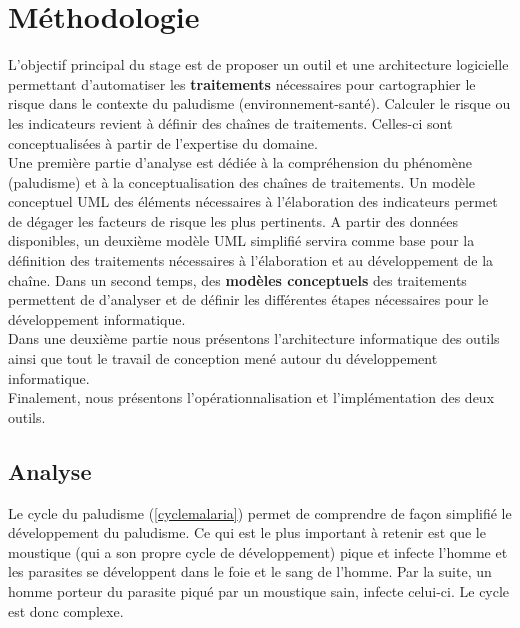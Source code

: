\chapter{Méthodologie} \label{Methodologie}

L'objectif principal du stage est de proposer un outil et une architecture logicielle permettant d'automatiser les \textbf{traitements} nécessaires pour cartographier le risque dans le contexte du paludisme (environnement-santé). Calculer le risque ou les indicateurs revient à définir des chaînes de traitements. Celles-ci sont conceptualisées à partir de l'expertise du domaine.\\


Une première partie d'analyse est dédiée à la compréhension du phénomène (paludisme) et à la conceptualisation des chaînes de traitements. Un modèle conceptuel UML des éléments nécessaires à l'élaboration des indicateurs permet de dégager les facteurs de risque les plus pertinents. A partir des données disponibles, un deuxième modèle UML simplifié servira comme base pour la définition des traitements nécessaires à l'élaboration et au développement de la chaîne. Dans un second temps, des \textbf{modèles conceptuels} des traitements permettent de d'analyser et de définir les différentes étapes nécessaires pour le développement informatique.\\ 

Dans une deuxième partie nous présentons l'architecture informatique des outils ainsi que tout le travail de conception mené autour du développement informatique.\\

Finalement, nous présentons l'opérationnalisation et l'implémentation des deux outils.


\section{Analyse}

Le cycle du paludisme (\ref{cyclemalaria}) permet de comprendre de façon simplifié le développement du paludisme. Ce qui est le plus important à retenir est que le moustique (qui a son propre cycle de développement) pique et infecte l'homme et les parasites se développent dans le foie et le sang de l'homme. Par la suite, un homme porteur du parasite piqué par un moustique sain, infecte celui-ci. Le cycle est donc complexe.


